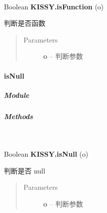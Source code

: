 \documentclass[letterpaper,10pt,english]{sphinxmanual}
\begin{document}
\begin{fulllineitems}
\label{api/seed/lang/isFunction:Lang.KISSY.isFunction}~
\begin{DUlineblock}{0em}
\item[] Boolean \textbf{KISSY.isFunction} (o)
\item[] 判断是否函数
\end{DUlineblock}
\begin{quote}\begin{description}
\item[{Parameters}] \leavevmode
\textbf{o} -- 判断参数

\end{description}\end{quote}

\end{fulllineitems}



\paragraph{isNull}
\label{api/seed/lang/isNull:isnull}\label{api/seed/lang/isNull::doc}

\subparagraph{Module}
\label{api/seed/lang/isNull:module}\begin{quote}

{\hyperref[api/seed/lang/index:module-Lang]{}}
\end{quote}


\subparagraph{Methods}
\label{api/seed/lang/isNull:methods}

\begin{fulllineitems}
\label{api/seed/lang/isNull:Lang.KISSY.isNull}~
\begin{DUlineblock}{0em}
\item[] Boolean \textbf{KISSY.isNull} (o)
\item[] 判断是否 null
\end{DUlineblock}
\begin{quote}\begin{description}
\item[{Parameters}] \leavevmode
\textbf{o} -- 判断参数

\end{description}\end{quote}

\end{fulllineitems}
\end{document}
